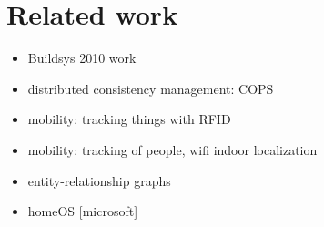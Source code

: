 \section{Related work}

\begin{itemize}
\item Buildsys 2010 work~\cite{hbci}
\item distributed consistency management: COPS
\item mobility: tracking things with RFID
\item mobility: tracking of people, wifi indoor localization
\item entity-relationship graphs

\item homeOS [microsoft]
\end{itemize}